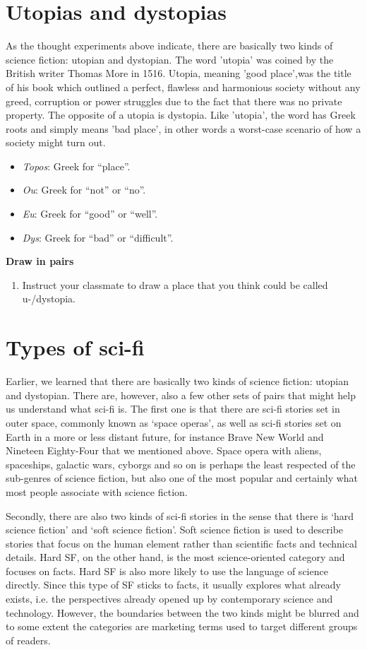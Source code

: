 \documentclass[11pt,a4paper,oneside]{book}
\newcommand{\tasktitle}[1]{{\color{blue}\bfseries #1}\par\smallskip}
\begin{document}
\section*{Utopias and dystopias}
As the thought experiments above indicate, there are basically two kinds of science fiction: utopian and dystopian. The word 'utopia' was coined by the British writer Thomas More in 1516. Utopia, meaning 'good place',was the title of his book which outlined a perfect, flawless and harmonious society without any greed, corruption or power struggles due to the fact that there was no private property. The opposite of a utopia is dystopia. Like 'utopia', the word has Greek roots and simply means 'bad place', in other words a worst-case scenario of how a society might turn out.


\begin{itemize}
\item \emph{Topos}: Greek for “place”.
\item \emph{Ou}: Greek for “not” or “no”.
\item \emph{Eu}: Greek for “good” or “well”.
\item \emph{Dys}: Greek for “bad” or “difficult”.
\end{itemize}
\begin{taskbox}
\tasktitle{Draw in pairs}
\begin{enumerate}
\item Instruct your classmate to draw a place that you think could be called u-/dystopia.
\end{enumerate}
\end{taskbox}

\section*{Types of sci-fi}
Earlier, we learned that there are basically two kinds of science fiction: utopian and dystopian. There are, however, also a few other sets of pairs that might help us understand what sci-fi is. The first one is that there are sci-fi stories set in outer space, commonly known as ‘space operas’, as well as sci-fi stories set on Earth in a more or less distant future, for instance Brave New World and Nineteen Eighty-Four that we mentioned above. Space opera with aliens, spaceships, galactic wars, cyborgs and so on is perhaps the least respected of the sub-genres of science fiction, but also one of the most popular and certainly what most people associate with science fiction.

Secondly, there are also two kinds of sci-fi stories in the sense that there is ‘hard science fiction’ and ‘soft science fiction’. Soft science fiction is used to describe stories that focus on the human element rather than scientific facts and technical details. Hard SF, on the other hand, is the most science-oriented category and focuses on facts. Hard SF is also more likely to use the language of science directly. Since this type of SF sticks to facts, it usually explores what already exists, i.e. the perspectives already opened up by contemporary science and technology. However, the boundaries between the two kinds might be blurred and to some extent the categories are marketing terms used to target different groups of readers.
\end{document}
